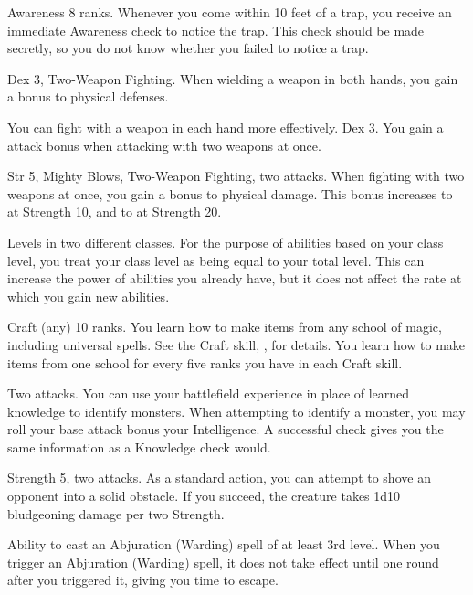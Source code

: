 \featpre Awareness 8 ranks.
\featben Whenever you come within 10 feet of a trap, you receive an immediate Awareness check to notice the trap.
This check should be made secretly, so you do not know whether you failed to notice a trap.

\featpres
Dex 3, Two-Weapon Fighting.
\featben When wielding a weapon in both hands, you gain a  bonus to physical defenses.

You can fight with a weapon in each hand more effectively.
\featpre Dex 3.
\featben You gain a  attack bonus when attacking with two weapons at once.

\featpres Str 5, Mighty Blows, Two-Weapon Fighting, two attacks.
\featben When fighting with two weapons at once, you gain a  bonus to physical damage.
This bonus increases to  at Strength 10, and to  at Strength 20.

\featpre Levels in two different classes.
\featben For the purpose of abilities based on your class level, you treat your class level as being equal to your total level.
This can increase the power of abilities you already have, but it does not affect the rate at which you gain new abilities.

\featpre Craft (any) 10 ranks.
\featben You learn how to make items from any school of magic, including universal spells.
See the Craft skill, , for details.
You learn how to make items from one school for every five ranks you have in each Craft skill.

\featpre Two attacks.
\featben You can use your battlefield experience in place of learned knowledge to identify monsters.
When attempting to identify a monster, you may roll your base attack bonus \add your Intelligence.
A successful check gives you the same information as a Knowledge check would.

\featpres Strength 5, two attacks.
\featben As a standard action, you can attempt to shove an opponent into a solid obstacle.
If you succeed, the creature takes 1d10 bludgeoning damage per two Strength.

\featpre Ability to cast an Abjuration (Warding) spell of at least 3rd level.
\featben When you trigger an Abjuration (Warding) spell, it does not take effect until one round after you triggered it, giving you time to escape.

